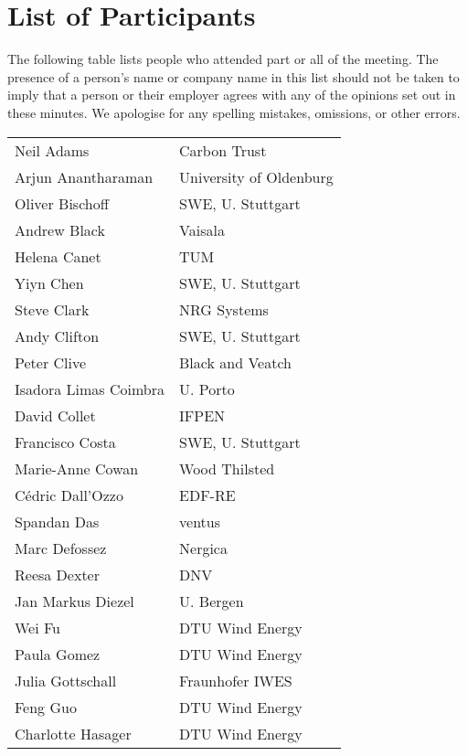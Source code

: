 \clearpage
\section*{List of Participants}

The following table lists people who attended part or all of the meeting. The presence of a person's name or company name in this list should not be taken to imply that a person or their employer agrees with any of the opinions set out in these minutes. We apologise for any spelling mistakes, omissions, or other errors.

\bgroup
{}
\begin{supertabular}{@{}|p{\tabcolsep}|p{\tabcolsep}|@{}}
Neil Adams & Carbon Trust \\
Arjun Anantharaman & University of Oldenburg \\
Oliver Bischoff & SWE, U. Stuttgart \\
Andrew Black & Vaisala \\
Helena Canet & TUM\\
Yiyn Chen & SWE, U. Stuttgart \\
Steve Clark & NRG Systems \\
Andy Clifton & SWE, U. Stuttgart \\
Peter Clive & Black and Veatch \\
Isadora Limas Coimbra & U. Porto \\
David Collet & IFPEN \\
Francisco Costa & SWE, U. Stuttgart \\
Marie-Anne Cowan & Wood Thilsted \\
C\'edric Dall'Ozzo & EDF-RE\\
Spandan Das & ventus \\
Marc Defossez & Nergica \\
Reesa Dexter & DNV \\
Jan Markus Diezel & U. Bergen \\
Wei Fu & DTU Wind Energy \\
Paula Gomez & DTU Wind Energy \\
Julia Gottschall & Fraunhofer IWES \\
Feng Guo & DTU Wind Energy \\
Charlotte Hasager & DTU Wind Energy \\

\end{supertabular}
